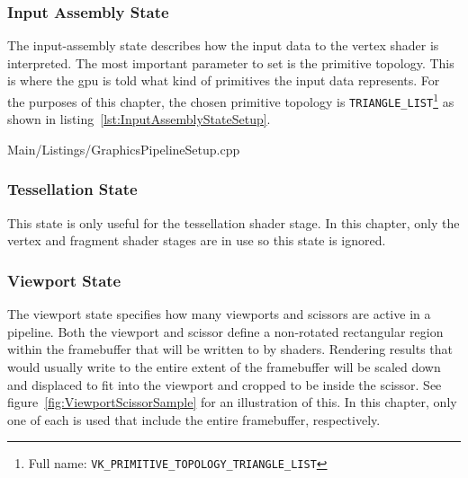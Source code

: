 
      \subsubsection{Input Assembly State}
        The input-assembly state describes how the input data to the vertex shader is interpreted.
        The most important parameter to set is the primitive topology.
        This is where the \gls{gpu} is told what kind of primitives the input data represents.
        For the purposes of this chapter, the chosen primitive topology is \lstinline{TRIANGLE_LIST}\footnote{Full name: \lstinline{VK_PRIMITIVE_TOPOLOGY_TRIANGLE_LIST}} as shown in listing~\ref{lst:InputAssemblyStateSetup}.

        
        {Main/Listings/GraphicsPipelineSetup.cpp}

      \subsubsection{Tessellation State}
        This state is only useful for the tessellation shader stage.
        In this chapter, only the vertex and fragment shader stages are in use so this state is ignored.

      \subsubsection{Viewport State}
      \label{sss:ViewportState}
        The viewport state specifies how many viewports and scissors are active in a pipeline.
        Both the viewport and scissor define a non-rotated rectangular region within the framebuffer that will be written to by shaders.
        Rendering results that would usually write to the entire extent of the framebuffer will be scaled down and displaced to fit into the viewport and cropped to be inside the scissor.
        See figure~\ref{fig:ViewportScissorSample} for an illustration of this.
        In this chapter, only one of each is used that include the entire framebuffer, respectively.

